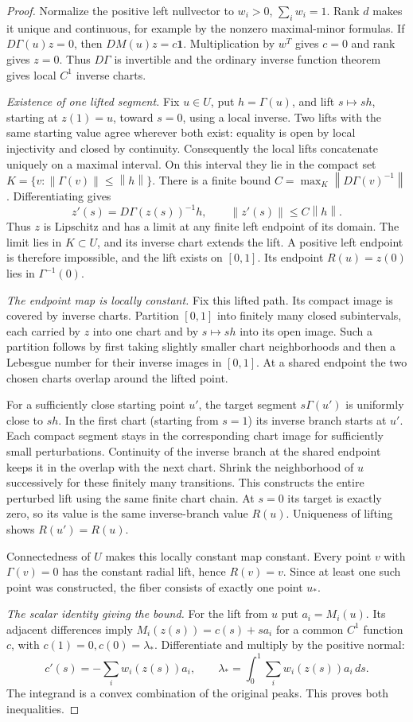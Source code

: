 \documentclass[11pt]{article}
\newcommand{\norm}[1]{\left\lVert#1\right\rVert}
\theoremstyle{remark}\newtheorem{remark}[theorem]{Remark}
\begin{document}
\begin{proof}
Normalize the positive left nullvector to $w_i>0$, $\sum_iw_i=1$.
Rank $d$ makes it unique and continuous, for example by the nonzero
maximal-minor formulas. If $D\Gamma(u)z=0$, then $DM(u)z=c\mathbf1$.
Multiplication by $w^T$ gives $c=0$ and rank gives $z=0$. Thus
$D\Gamma$ is invertible and the ordinary inverse function theorem gives
local $C^1$ inverse charts.

\emph{Existence of one lifted segment.} Fix $u\in U$, put $h=\Gamma(u)$,
and lift $s\mapsto sh$, starting at $z(1)=u$, toward $s=0$, using a local
inverse. Two lifts with the same starting value agree wherever both
exist: equality is open by local injectivity and closed by continuity.
Consequently the local lifts concatenate uniquely on a maximal interval.
On this interval they lie in the compact set
$K=\{v:\norm{\Gamma(v)}\le\norm h\}$. There is a finite bound
$C=\max_K\norm{D\Gamma(v)^{-1}}$. Differentiating gives
\[
 z'(s)=D\Gamma(z(s))^{-1}h,\qquad\norm{z'(s)}\le C\norm h.
\]
Thus $z$ is Lipschitz and has a limit at any finite left endpoint of its
domain. The limit lies in $K\subset U$, and its inverse chart extends
the lift. A positive left endpoint is therefore impossible, and the lift
exists on $[0,1]$. Its endpoint $R(u)=z(0)$ lies in $\Gamma^{-1}(0)$.

\emph{The endpoint map is locally constant.} Fix this lifted path.
Its compact image is covered by inverse charts. Partition $[0,1]$ into
finitely many closed subintervals, each carried by $z$ into one chart
and by $s\mapsto sh$ into its open image. Such a partition follows by
first taking slightly smaller chart neighborhoods and then a Lebesgue
number for their inverse images in $[0,1]$. At a shared endpoint the two
chosen charts overlap around the lifted point.

For a sufficiently close starting point $u'$, the target segment
$s\Gamma(u')$ is uniformly close to $sh$. In the first chart (starting
from $s=1$) its inverse branch starts at $u'$. Each compact segment stays
in the corresponding chart image for sufficiently small perturbations.
Continuity of the inverse branch at the shared endpoint keeps it in the
overlap with the next chart. Shrink the neighborhood of $u$ successively
for these finitely many transitions. This constructs the entire perturbed
lift using the same finite chart chain. At $s=0$ its target is exactly
zero, so its value is the same inverse-branch value $R(u)$.
Uniqueness of lifting shows $R(u')=R(u)$.

Connectedness of $U$ makes this locally constant map constant. Every
point $v$ with $\Gamma(v)=0$ has the constant radial lift, hence $R(v)=v$.
Since at least one such point was constructed, the fiber consists of
exactly one point $u_*$.

\emph{The scalar identity giving the bound.} For the lift from $u$ put
$a_i=M_i(u)$. Its adjacent differences imply
$M_i(z(s))=c(s)+sa_i$ for a common $C^1$ function $c$, with
$c(1)=0,c(0)=\lambda_*$. Differentiate and multiply by the positive
normal:
\[
 c'(s)=-\sum_iw_i(z(s))a_i,\qquad
 \lambda_*=\int_0^1\sum_iw_i(z(s))a_i\,ds.
\]
The integrand is a convex combination of the original peaks. This proves
both inequalities.
\end{proof}
\end{document}

